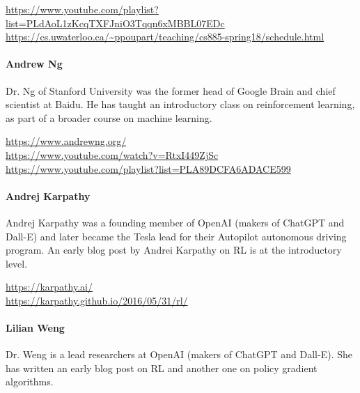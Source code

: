 \begin{tcolorbox}[colback=code]
\footnotesize
\url{https://www.youtube.com/playlist?list=PLdAoL1zKcqTXFJniO3Tqqn6xMBBL07EDc} \\

\url{https://cs.uwaterloo.ca/~ppoupart/teaching/cs885-spring18/schedule.html}
\end{tcolorbox}


\paragraph*{Andrew Ng}

Dr. Ng of Stanford University was the former head of Google Brain and chief scientist at Baidu. He has taught an introductory class on reinforcement learning, as part of a broader course on machine learning. \\

\begin{tcolorbox}[colback=code]
\footnotesize
\url{https://www.andrewng.org/} \\

\url{https://www.youtube.com/watch?v=RtxI449ZjSc} \\

\url{https://www.youtube.com/playlist?list=PLA89DCFA6ADACE599}
\end{tcolorbox}


\paragraph*{Andrej Karpathy}

Andrej Karpathy was a founding member of OpenAI (makers of ChatGPT and Dall-E) and later became the Tesla lead for their Autopilot autonomous driving program. An early blog post by Andrei Karpathy on RL is at the introductory level. \\

\begin{tcolorbox}[colback=code]
\footnotesize
\url{https://karpathy.ai/} \\

\url{https://karpathy.github.io/2016/05/31/rl/}
\end{tcolorbox}


\paragraph*{Lilian Weng}

Dr. Weng is a lead researchers at OpenAI (makers of ChatGPT and Dall-E). She has written an early blog post on RL and another one on policy gradient algorithms. \\

